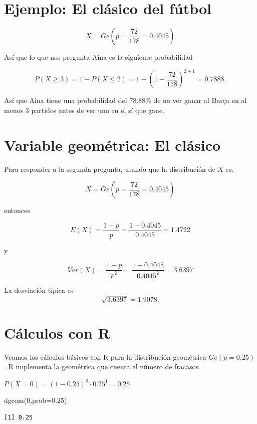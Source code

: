 \documentclass[
  letterpaper,
  DIV=11,
  numbers=noendperiod]{scrreprt}
\newenvironment{Shaded}{\begin{snugshade}}{\end{snugshade}}
\newcommand{\AttributeTok}[1]{\textcolor[rgb]{0.40,0.45,0.13}{#1}}
\newcommand{\DecValTok}[1]{\textcolor[rgb]{0.68,0.00,0.00}{#1}}
\newcommand{\FloatTok}[1]{\textcolor[rgb]{0.68,0.00,0.00}{#1}}
\newcommand{\FunctionTok}[1]{\textcolor[rgb]{0.28,0.35,0.67}{#1}}
\newcommand{\NormalTok}[1]{\textcolor[rgb]{0.00,0.23,0.31}{#1}}
\begin{document}
\section{Ejemplo: El clásico del
fútbol}\label{ejemplo-el-cluxe1sico-del-fuxfatbol-2}

\[X=Ge\left(p=\frac{72}{178}=0.4045\right)\]

Así que lo que nos pregunta Aina es la siguiente probabilidad

\[P(X\geq 3)=1-P(X\leq 2)=1-\left(1-\frac{72}{178}\right)^{2+1}=0.7888.\]

Así que Aina tiene una probabilidad del \(78.88\%\) de no ver ganar al
Barça en al menos 3 partidos antes de ver uno en el sí que gane.

\section{Variable geométrica: El
clásico}\label{variable-geomuxe9trica-el-cluxe1sico}

Para responder a la segunda pregunta, usando que la distribución de
\(X\) es:

\[X=Ge\left(p=\frac{72}{178}=0.4045\right)\]

entonces

\[E(X)=\frac{1-p}{p}=\frac{1-0.4045}{0.4045}=1.4722\]

y

\[Var(X)=\frac{1-p}{p^2}=\frac{1-0.4045}{0.4045^2}=3.6397\]

La desviación típica es \[\sqrt{3.6397}=1.9078.\]

\section{Cálculos con R}\label{cuxe1lculos-con-r}

Veamos los cálculos básicos con R para la distribución geométrica
\(Ge(p=0.25)\). R implementa la geométrica que cuenta el número de
fracasos.

\(P(X=0)=(1-0.25)^0\cdot 0.25^1=0.25\)

\begin{Shaded}
\begin{Highlighting}[]
\FunctionTok{dgeom}\NormalTok{(}\DecValTok{0}\NormalTok{,}\AttributeTok{prob=}\FloatTok{0.25}\NormalTok{)}
\end{Highlighting}
\end{Shaded}

\begin{verbatim}
[1] 0.25
\end{verbatim}
\end{document}
